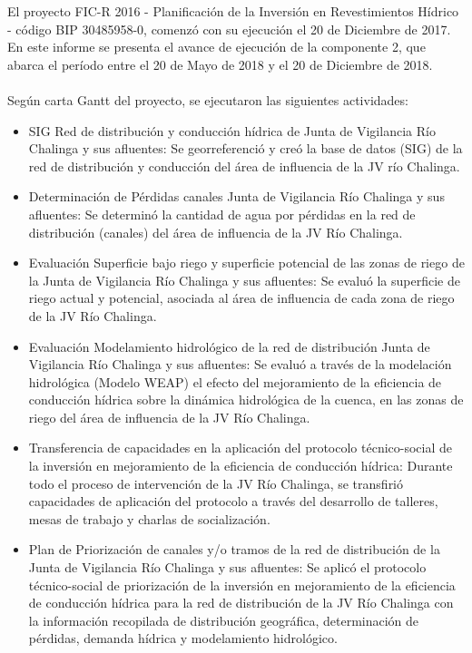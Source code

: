 \documentclass[]{article}
\begin{document}
El proyecto FIC-R 2016 - Planificación de la Inversión en Revestimientos Hídrico - código BIP 30485958-0, comenzó con su ejecución el 20 de Diciembre de 2017. En este informe se presenta el avance de ejecución de la componente 2, que abarca el período entre el 20 de Mayo de 2018 y el 20 de Diciembre de 2018.\\
\\
Según carta Gantt del proyecto, se ejecutaron las siguientes actividades:
\begin{itemize}
\item SIG Red de distribución y conducción hídrica de Junta de Vigilancia Río Chalinga y sus afluentes: Se georreferenció y creó la base de datos (SIG) de la red de distribución y conducción del área de influencia de la JV río Chalinga. 
\item Determinación de Pérdidas canales Junta de Vigilancia Río Chalinga y sus afluentes: Se determinó la cantidad de agua por pérdidas en la red de distribución (canales) del área de influencia de la JV Río Chalinga.
\item Evaluación Superficie bajo riego y superficie potencial de las zonas de riego de la Junta de Vigilancia Río Chalinga y sus afluentes: Se evaluó la superficie de riego actual y potencial, asociada al área de influencia de cada zona de riego de la JV Río Chalinga.
\item Evaluación Modelamiento hidrológico de la red de distribución Junta de Vigilancia Río Chalinga y sus afluentes: Se evaluó a través de la modelación hidrológica (Modelo WEAP) el efecto del mejoramiento de la eficiencia de conducción hídrica sobre la dinámica hidrológica de la cuenca, en las zonas de riego del área de influencia de la JV Río Chalinga.
\item Transferencia de capacidades en la aplicación del protocolo técnico-social de la inversión en mejoramiento de la eficiencia de conducción hídrica: Durante todo el proceso de intervención de la JV Río Chalinga, se transfirió capacidades de aplicación del protocolo a través del desarrollo de talleres, mesas de trabajo y charlas de socialización.
\item Plan de Priorización de canales y/o tramos de la red de distribución de la Junta de Vigilancia Río Chalinga y sus afluentes: Se aplicó el protocolo técnico-social de priorización de la inversión en mejoramiento de la eficiencia de conducción hídrica para la red de distribución de la JV Río Chalinga con la información recopilada de distribución geográfica, determinación de pérdidas, demanda hídrica y modelamiento hidrológico.
\end{itemize}
\end{document}
